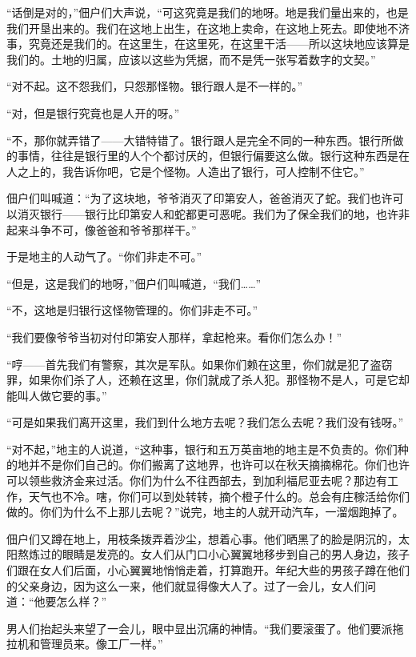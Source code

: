 \documentclass[12pt,UTF-8,openany]{ctexbook}
\begin{document}
\begin{normalsize}
    “话倒是对的，”佃户们大声说，“可这究竟是我们的地呀。地是我们量出来的，也是我们开垦出来的。我们在这地上出生，在这地上卖命，在这地上死去。即使地不济事，究竟还是我们的。在这里生，在这里死，在这里干活——所以这块地应该算是我们的。土地的归属，应该以这些为凭据，而不是凭一张写着数字的文契。”
    
    “对不起。这不怨我们，只怨那怪物。银行跟人是不一样的。”
    
    “对，但是银行究竟也是人开的呀。”
    
    “不，那你就弄错了——大错特错了。银行跟人是完全不同的一种东西。银行所做的事情，往往是银行里的人个个都讨厌的，但银行偏要这么做。银行这种东西是在人之上的，我告诉你吧，它是个怪物。人造出了银行，可人控制不住它。”
    
    佃户们叫喊道：“为了这块地，爷爷消灭了印第安人，爸爸消灭了蛇。我们也许可以消灭银行——银行比印第安人和蛇都更可恶呢。我们为了保全我们的地，也许非起来斗争不可，像爸爸和爷爷那样干。”
    
    于是地主的人动气了。“你们非走不可。”
    
    “但是，这是我们的地呀，”佃户们叫喊道，“我们……”
    
    “不，这地是归银行这怪物管理的。你们非走不可。”
    
    “我们要像爷爷当初对付印第安人那样，拿起枪来。看你们怎么办！”
    
    “哼——首先我们有警察，其次是军队。如果你们赖在这里，你们就是犯了盗窃罪，如果你们杀了人，还赖在这里，你们就成了杀人犯。那怪物不是人，可是它却能叫人做它要的事。”
    
    “可是如果我们离开这里，我们到什么地方去呢？我们怎么去呢？我们没有钱呀。”
    
    “对不起，”地主的人说道，“这种事，银行和五万英亩地的地主是不负责的。你们种的地并不是你们自己的。你们搬离了这地界，也许可以在秋天摘摘棉花。你们也许可以领些救济金来过活。你们为什么不往西部去，到加利福尼亚去呢？那边有工作，天气也不冷。嗐，你们可以到处转转，摘个橙子什么的。总会有庄稼活给你们做的。你们为什么不上那儿去呢？”说完，地主的人就开动汽车，一溜烟跑掉了。
    
    佃户们又蹲在地上，用枝条拨弄着沙尘，想着心事。他们晒黑了的脸是阴沉的，太阳熬炼过的眼睛是发亮的。女人们从门口小心翼翼地移步到自己的男人身边，孩子们跟在女人们后面，小心翼翼地悄悄走着，打算跑开。年纪大些的男孩子蹲在他们的父亲身边，因为这么一来，他们就显得像大人了。过了一会儿，女人们问道：“他要怎么样？”
    
    男人们抬起头来望了一会儿，眼中显出沉痛的神情。“我们要滚蛋了。他们要派拖拉机和管理员来。像工厂一样。”
    

\end{normalsize}
\end{document}
